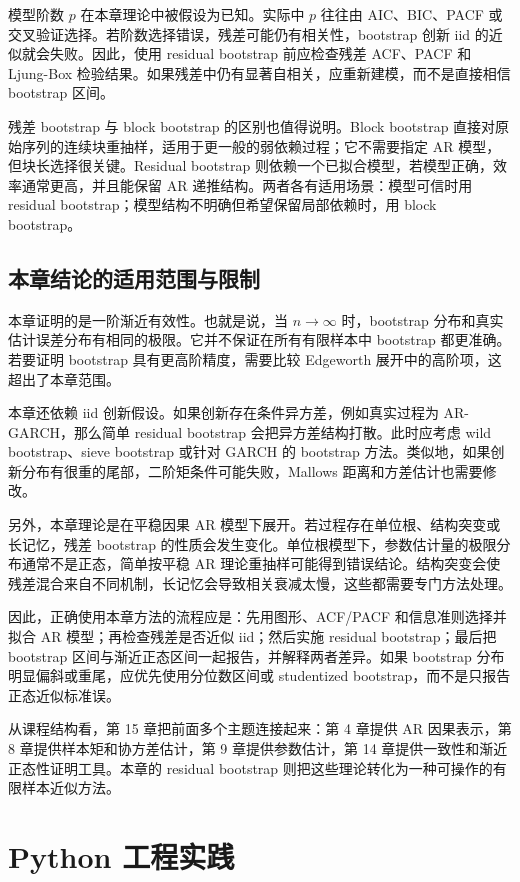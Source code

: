 \documentclass[11pt,a4paper,openany]{ctexbook}
\begin{document}
模型阶数 \(p\) 在本章理论中被假设为已知。实际中 \(p\) 往往由 AIC、BIC、PACF 或交叉验证选择。若阶数选择错误，残差可能仍有相关性，bootstrap 创新 iid 的近似就会失败。因此，使用 residual bootstrap 前应检查残差 ACF、PACF 和 Ljung-Box 检验结果。如果残差中仍有显著自相关，应重新建模，而不是直接相信 bootstrap 区间。

残差 bootstrap 与 block bootstrap 的区别也值得说明。Block bootstrap 直接对原始序列的连续块重抽样，适用于更一般的弱依赖过程；它不需要指定 AR 模型，但块长选择很关键。Residual bootstrap 则依赖一个已拟合模型，若模型正确，效率通常更高，并且能保留 AR 递推结构。两者各有适用场景：模型可信时用 residual bootstrap；模型结构不明确但希望保留局部依赖时，用 block bootstrap。

\subsection{本章结论的适用范围与限制}

本章证明的是一阶渐近有效性。也就是说，当 \(n\to\infty\) 时，bootstrap 分布和真实估计误差分布有相同的极限。它并不保证在所有有限样本中 bootstrap 都更准确。若要证明 bootstrap 具有更高阶精度，需要比较 Edgeworth 展开中的高阶项，这超出了本章范围。

本章还依赖 iid 创新假设。如果创新存在条件异方差，例如真实过程为 AR-GARCH，那么简单 residual bootstrap 会把异方差结构打散。此时应考虑 wild bootstrap、sieve bootstrap 或针对 GARCH 的 bootstrap 方法。类似地，如果创新分布有很重的尾部，二阶矩条件可能失败，Mallows 距离和方差估计也需要修改。

另外，本章理论是在平稳因果 AR 模型下展开。若过程存在单位根、结构突变或长记忆，残差 bootstrap 的性质会发生变化。单位根模型下，参数估计量的极限分布通常不是正态，简单按平稳 AR 理论重抽样可能得到错误结论。结构突变会使残差混合来自不同机制，长记忆会导致相关衰减太慢，这些都需要专门方法处理。

因此，正确使用本章方法的流程应是：先用图形、ACF/PACF 和信息准则选择并拟合 AR 模型；再检查残差是否近似 iid；然后实施 residual bootstrap；最后把 bootstrap 区间与渐近正态区间一起报告，并解释两者差异。如果 bootstrap 分布明显偏斜或重尾，应优先使用分位数区间或 studentized bootstrap，而不是只报告正态近似标准误。

从课程结构看，第 15 章把前面多个主题连接起来：第 4 章提供 AR 因果表示，第 8 章提供样本矩和协方差估计，第 9 章提供参数估计，第 14 章提供一致性和渐近正态性证明工具。本章的 residual bootstrap 则把这些理论转化为一种可操作的有限样本近似方法。

\section{Python 工程实践}
\end{document}
